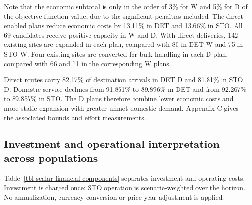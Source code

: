 \documentclass[
  english,
  11pt,
  a4paper,
  authoryear,
  preprint]{elsarticle}
\begin{document}
Note that the economic subtotal is only in the order of 3\% for W and
5\% for D of the objective function value, due to the significant
penalties included. The direct-enabled plans reduce economic costs by
13.11\% in DET and 13.66\% in STO. All 69 candidates receive positive
capacity in W and D. With direct deliveries, 142 existing sites are
expanded in each plan, compared with 80 in DET W and 75 in STO W. Four
existing sites are converted for bulk handling in each D plan, compared
with 66 and 71 in the corresponding W plans.

Direct routes carry 82.17\% of destination arrivals in DET D and 81.81\%
in STO D. Domestic service declines from 91.861\% to 89.896\% in DET and
from 92.267\% to 89.857\% in STO. The D plans therefore combine lower
economic costs and more static expansion with greater unmet domestic
demand. Appendix C gives the associated bounds and effort measurements.

\subsection{Investment and operational interpretation across
populations}\label{investment-and-operational-interpretation-across-populations}

Table~\ref{tbl-scalar-financial-components} separates investment and
operating costs. Investment is charged once; STO operation is
scenario-weighted over the horizon. No annualization, currency
conversion or price-year adjustment is applied.
\end{document}
